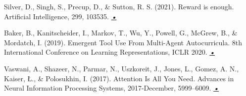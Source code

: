 \begin{thebibliography}{99}

 Silver, D., Singh, S., Precup, D., \& Sutton, R. S. (2021). Reward is enough. Artificial Intelligence, 299, 103535.  \href{ https://doi.org/10.1016/J.ARTINT.2021.103535}{\emph{•}}

 Baker, B., Kanitscheider, I., Markov, T., Wu, Y., Powell, G., McGrew, B., \& Mordatch, I. (2019). Emergent Tool Use From Multi-Agent Autocurricula. 8th International Conference on Learning Representations, ICLR 2020. \href{https://arxiv.org/abs/1909.07528v2}{\emph{•}}

 Vaswani, A., Shazeer, N., Parmar, N., Uszkoreit, J., Jones, L., Gomez, A. N., Kaiser, Ł., \& Polosukhin, I. (2017). Attention Is All You Need. Advances in Neural Information Processing Systems, 2017-December, 5999–6009. \href{https://arxiv.org/abs/1706.03762v7}{\emph{•}}


\end{thebibliography}
